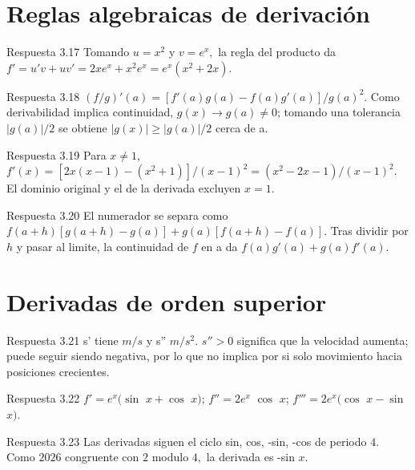 \documentclass[10pt,a4paper,oneside,openany]{book}
\begin{document}
\section{Reglas algebraicas de derivación}
\begin{PSevenAnswerFixed}{Respuesta 3.17}
Tomando \(u=x^{2}\) y \(v=e^x,\) la regla del producto da \(f'=u'v+uv'=2xe^x+x^{2}e^x=e^x(x^{2}+2x)\).
\end{PSevenAnswerFixed}
\begin{PSevenAnswerFixed}{Respuesta 3.18}
\((f/g)'(a)=[f'(a)g(a)-f(a)g'(a)]/g(a)^{2}\). Como derivabilidad implica continuidad, \(g(x)\to g(a)\ne 0\); tomando una tolerancia \(|g(a)|/2\) se obtiene \(|g(x)|\ge |g(a)|/2\) cerca de a.
\end{PSevenAnswerFixed}
\begin{PSevenAnswerFixed}{Respuesta 3.19}
Para \(x\ne 1,\) \(f'(x)=[2x(x-1)-(x^{2}+1)]/(x-1)^{2}=(x^{2}-2x-1)/(x-1)^{2}\). El dominio original y el de la derivada excluyen \(x=1\).
\end{PSevenAnswerFixed}
\begin{PSevenAnswerFixed}{Respuesta 3.20}
El numerador se separa como \(f(a+h)[g(a+h)-g(a)]+g(a)[f(a+h)-f(a)]\). Tras dividir por \(h\) y pasar al limite, la continuidad de \(f\) en a da \(f(a)g'(a)+g(a)f'(a)\).
\end{PSevenAnswerFixed}
\section{Derivadas de orden superior}
\begin{PSevenAnswerFixed}{Respuesta 3.21}
s' tiene \(m/s\) y s'' \(m/s^{2}\). \(s''>0\) significa que la velocidad aumenta; puede seguir siendo negativa, por lo que no implica por si solo movimiento hacia posiciones crecientes.
\end{PSevenAnswerFixed}
\begin{PSevenAnswerFixed}{Respuesta 3.22}
\(f'=e^x(\sin\) \(x+\cos\) \(x)\); \(f''=2e^x\) \(\cos\) \(x\); \(f'''=2e^x(\cos\) \(x-\sin\) \(x)\).
\end{PSevenAnswerFixed}
\begin{PSevenAnswerFixed}{Respuesta 3.23}
Las derivadas siguen el ciclo sin, cos, -sin, -cos de periodo \(4\). Como \(2026\) congruente con \(2\) modulo \(4,\) la derivada es -sin \(x\).
\end{PSevenAnswerFixed}
\end{document}
